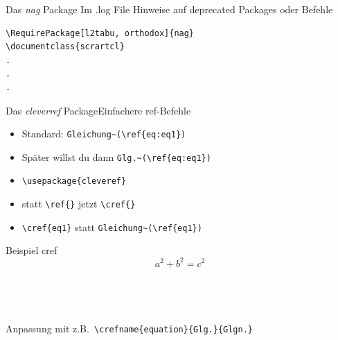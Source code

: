 \documentclass[ngerman, hyperref={pdfpagelabels=false}]{beamer}
\begin{document}
\begin{frame}[fragile]{Das \textit{nag} Package}
    {Im .log File Hinweise auf deprecated Packages oder Befehle}
    \begin{Verbatim}
\RequirePackage[l2tabu, orthodox]{nag}
\documentclass{scrartcl}
.
.
.
    \end{Verbatim}
\end{frame}

\begin{frame}[fragile]{Das \textit{cleverref} Package}{Einfachere ref-Befehle}
    \begin{block}{}
        \begin{itemize}
            \item Standard: \verb!Gleichung~(\ref{eq:eq1})!
            \item Später willst du dann \verb!Glg.~(\ref{eq:eq1})!
                \pause
            \item \verb!\usepackage{cleveref}!
            \item statt \verb!\ref{}! jetzt \verb!\cref{}!
            \item \verb!\cref{eq1}! statt \verb!Gleichung~(\ref{eq1})!
        \end{itemize}
    \end{block}
\end{frame}
\begin{frame}[fragile]{Beispiel cref}
    \begin{equation}
        a^2 + b^2 = c^2
        \label{eq:pythagoras}
    \end{equation}
    \cprotect{}
\\ ~\\~\\
    \cprotect{}
    \pause
    \\
    \bigskip
    Anpassung mit z.B.\ \verb!\crefname{equation}{Glg.}{Glgn.}!
\end{frame}
\end{document}
